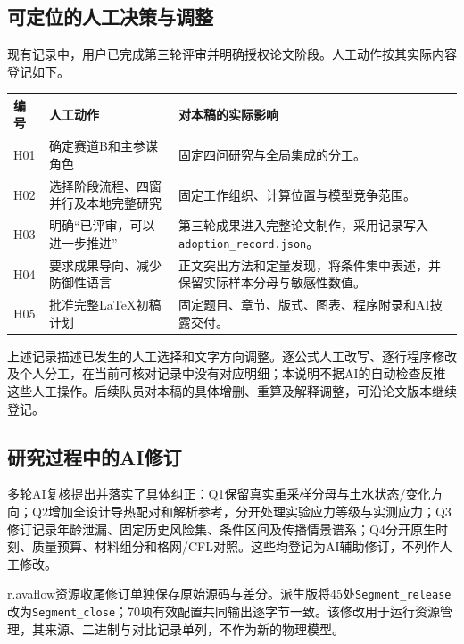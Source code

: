 \documentclass[UTF8,a4paper,zihao=-4,fontset=none]{ctexart}
\newcommand{\AIfile}[1]{\texttt{\nolinkurl{#1}}}
\begin{document}
\subsection{可定位的人工决策与调整}
现有记录中，用户已完成第三轮评审并明确授权论文阶段。人工动作按其实际内容登记如下。
\begin{table}[H]\centering\small
\begin{tabularx}{\textwidth}{p{1.1cm}p{4.1cm}Y}
\toprule 编号 & 人工动作 & 对本稿的实际影响 \\
\midrule
H01 & 确定赛道B和主参谋角色 & 固定四问研究与全局集成的分工。 \\
H02 & 选择阶段流程、四窗并行及本地完整研究 & 固定工作组织、计算位置与模型竞争范围。 \\
H03 & 明确“已评审，可以进一步推进” & 第三轮成果进入完整论文制作，采用记录写入\AIfile{adoption_record.json}。 \\
H04 & 要求成果导向、减少防御性语言 & 正文突出方法和定量发现，将条件集中表述，并保留实际样本分母与敏感性数值。 \\
H05 & 批准完整LaTeX初稿计划 & 固定题目、章节、版式、图表、程序附录和AI披露交付。 \\
\bottomrule
\end{tabularx}
\end{table}

上述记录描述已发生的人工选择和文字方向调整。逐公式人工改写、逐行程序修改及个人分工，在当前可核对记录中没有对应明细；本说明不据AI的自动检查反推这些人工操作。后续队员对本稿的具体增删、重算及解释调整，可沿论文版本继续登记。

\subsection{研究过程中的AI修订}
多轮AI复核提出并落实了具体纠正：Q1保留真实重采样分母与土水状态/变化方向；Q2增加全设计导热配对和解析参考，分开处理实验应力等级与实测应力；Q3修订记录年龄泄漏、固定历史风险集、条件区间及传播情景谱系；Q4分开原生时刻、质量预算、材料组分和格网/CFL对照。这些均登记为AI辅助修订，不列作人工修改。

r.avaflow资源收尾修订单独保存原始源码与差分。派生版将45处\AIfile{Segment_release}改为\AIfile{Segment_close}；70项有效配置共同输出逐字节一致。该修改用于运行资源管理，其来源、二进制与对比记录单列，不作为新的物理模型。
\end{document}
